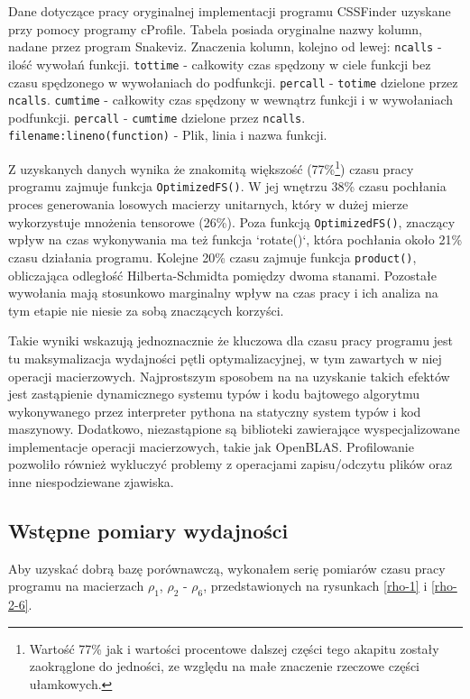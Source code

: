 \documentclass[11pt, a4paper]{article}
\newcommand{\code}[1]{\texttt{#1}}
\begin{document}
\begin{sloppypar}
    \FloatBarrier
    \begin{table}[ht]
      \tiny
      \centering
      
      \caption{Dane dotyczące pracy oryginalnej implementacji programu CSSFinder uzyskane przy pomocy programy cProfile. Tabela posiada oryginalne nazwy kolumn, nadane przez program Snakeviz. Znaczenia kolumn, kolejno od lewej: \code{ncalls} - ilość wywołań funkcji. \code{tottime} - całkowity czas spędzony w ciele funkcji bez czasu spędzonego w wywołaniach do podfunkcji. \code{percall} - \code{totime} dzielone przez \code{ncalls}. \code{cumtime} - całkowity czas spędzony w wewnątrz funkcji i w wywołaniach podfunkcji. \code{percall} - \code{cumtime} dzielone przez \code{ncalls}. \code{filename:lineno(function)} - Plik, linia i nazwa funkcji.}
    \end{table}
    \FloatBarrier

    Z uzyskanych danych wynika że znakomitą większość (77\%\footnote{Wartość 77\% jak i
    wartości procentowe dalszej części tego akapitu zostały zaokrąglone do jedności, ze względu
    na małe znaczenie rzeczowe części ułamkowych.}) czasu pracy programu zajmuje funkcja
    \code{OptimizedFS()}. W jej wnętrzu 38\% czasu pochłania proces generowania losowych
    macierzy unitarnych, który w dużej mierze wykorzystuje mnożenia tensorowe (26\%).
    Poza funkcją \code{OptimizedFS()}, znaczący wpływ na czas wykonywania ma też funkcja
    `rotate()`, która pochłania około 21\% czasu działania programu. Kolejne 20\% czasu
    zajmuje funkcja \code{product()}, obliczająca odległość Hilberta-Schmidta pomiędzy
    dwoma stanami. Pozostałe wywołania mają stosunkowo marginalny wpływ na czas pracy i ich
    analiza na tym etapie nie niesie za sobą znaczących korzyści.

    Takie wyniki wskazują jednoznacznie że kluczowa dla czasu pracy programu jest tu maksymalizacja
    wydajności pętli optymalizacyjnej, w tym zawartych w niej operacji macierzowych. Najprostszym
    sposobem na na uzyskanie takich efektów jest zastąpienie dynamicznego systemu typów i
    kodu bajtowego algorytmu wykonywanego przez interpreter pythona na statyczny system typów
    i kod maszynowy. Dodatkowo, niezastąpione są biblioteki zawierające wyspecjalizowane
    implementacje operacji macierzowych, takie jak OpenBLAS. Profilowanie pozwoliło również
    wykluczyć problemy z operacjami zapisu/odczytu plików oraz inne niespodziewane zjawiska.

    \subsection{Wstępne pomiary wydajności}
    Aby uzyskać dobrą bazę porównawczą, wykonałem serię pomiarów czasu pracy programu na
    macierzach $\rho_{1}$, $\rho_{2}$ - $\rho_{6}$, przedstawionych na rysunkach
    \ref{rho-1} i \ref{rho-2-6}.


\end{sloppypar}
\end{document}
